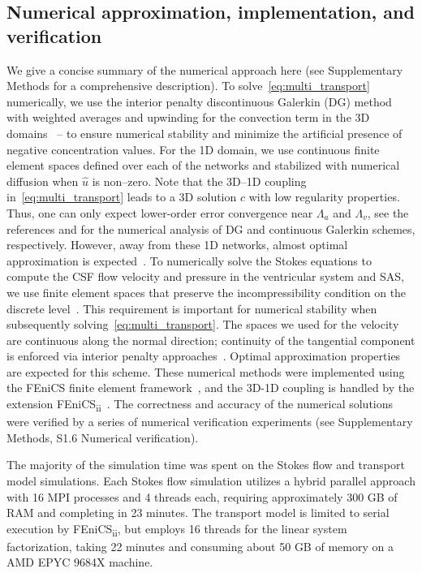 \documentclass[fleqn,10pt]{wlscirep}
\begin{document}
\subsection*{Numerical approximation, implementation, and verification}

We give a concise summary of the numerical approach here (see
Supplementary Methods for a comprehensive description). To
solve~\eqref{eq:multi_transport} numerically, we use the interior
penalty discontinuous Galerkin (DG) method with weighted averages and
upwinding for the convection term in the 3D
domains~\cite{ern2009discontinuous} -- to ensure numerical stability
and minimize the artificial presence of negative concentration
values. For the 1D domain, we use continuous finite element spaces
defined over each of the networks and stabilized with numerical
diffusion when $\hat{u}$ is non--zero. Note that the 3D--1D coupling
in~\eqref{eq:multi_transport} leads to a 3D solution $c$ with low
regularity properties. Thus, one can only expect lower-order error
convergence near $\Lambda_a$ and $\Lambda_v$, see the references
\cite{masri2024discontinuous} and \cite{laurino2019derivation} for the
numerical analysis of DG and continuous Galerkin schemes,
respectively. However, away from these 1D networks, almost optimal
approximation is
expected~\cite{masri2023discontinuous,koppl2016local}. To numerically
solve the Stokes equations to compute the CSF flow velocity and
pressure in the ventricular system and SAS, we use finite element
spaces that preserve the incompressibility condition on the discrete
level~\cite{hong2016robust}. This requirement is important for
numerical stability when subsequently
solving~\eqref{eq:multi_transport}\cite{cesmelioglu2022compatible}.
The spaces we used for the velocity are continuous along the normal
direction; continuity of the tangential component is enforced via
interior penalty approaches~\cite{hong2016robust}. Optimal
approximation properties are expected for this scheme. These numerical
methods were implemented using the FEniCS finite element
framework~\cite{alnaes2015fenics}, and the 3D-1D coupling is handled
by the extension FEniCS\textsubscript{ii}~\cite{kuchta2020assembly}.
The correctness and accuracy of the numerical solutions were verified
by a series of numerical verification experiments (see Supplementary
Methods, S1.6 Numerical verification).

The majority of the simulation time was spent on the Stokes flow and transport model simulations. Each Stokes flow simulation utilizes a hybrid parallel approach with 16 MPI processes and 4 threads each, requiring approximately 300 GB of RAM and completing in 23 minutes. The transport model is limited to serial execution by FEniCS\textsubscript{ii}, but employs 16 threads for the linear system factorization, taking 22 minutes and consuming about 50 GB of memory on a AMD EPYC 9684X machine.
\end{document}

